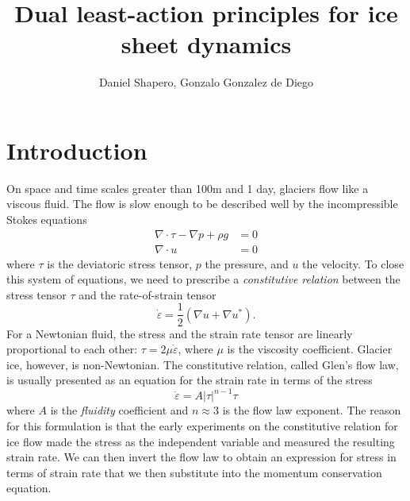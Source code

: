 \documentclass{article}
\title{Dual least-action principles for ice sheet dynamics}
\author{Daniel Shapero, Gonzalo Gonzalez de Diego}
\date{}
\theoremstyle{definition}
\theoremstyle{plain}
\begin{document}
\maketitle

\section{Introduction}

On space and time scales greater than 100m and 1 day, glaciers flow like a viscous fluid.
The flow is slow enough to be described well by the incompressible Stokes equations
\begin{align}
    \nabla\cdot\tau - \nabla p + \rho g & = 0 \\
    \nabla\cdot u & = 0
\end{align}
where $\tau$ is the deviatoric stress tensor, $p$ the pressure, and $u$ the velocity.
To close this system of equations, we need to prescribe a \emph{constitutive relation} between the stress tensor $\tau$ and the rate-of-strain tensor
\begin{equation}
    \dot\varepsilon = \frac{1}{2}(\nabla u + \nabla u^*).
\end{equation}
For a Newtonian fluid, the stress and the strain rate tensor are linearly proportional to each other: $\tau = 2\mu\dot\varepsilon$, where $\mu$ is the viscosity coefficient.
Glacier ice, however, is non-Newtonian.
The constitutive relation, called Glen's flow law, is usually presented as an equation for the strain rate in terms of the stress
\begin{equation}
    \dot\varepsilon = A|\tau|^{n - 1}\tau
    \label{eq:glen-flow-law}
\end{equation}
where $A$ is the \emph{fluidity} coefficient and $n \approx 3$ is the flow law exponent.
The reason for this formulation is that the early experiments on the constitutive relation for ice flow made the stress as the independent variable and measured the resulting strain rate.
We can then invert the flow law to obtain an expression for stress in terms of strain rate that we then substitute into the momentum conservation equation.
\end{document}
